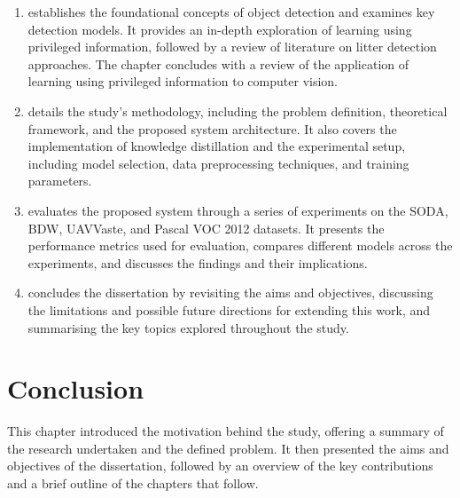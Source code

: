 \begin{enumerate}[label=\textbf{Chapter \arabic*}, leftmargin=*, start=2]
    

    \item establishes the foundational concepts of object detection and examines key detection models. It provides an in-depth exploration of learning using privileged information, followed by a review of literature on litter detection approaches. The chapter concludes with a review of the application of learning using privileged information to computer vision.
    
    \item details the study's methodology, including the problem definition, theoretical framework, and the proposed system architecture. It also covers the implementation of knowledge distillation and the experimental setup, including model selection, data preprocessing techniques, and training parameters.
    
    \item evaluates the proposed system through a series of experiments on the SODA, BDW, UAVVaste, and Pascal VOC 2012 datasets. It presents the performance metrics used for evaluation, compares different models across the experiments, and discusses the findings and their implications.
    

    \item concludes the dissertation by revisiting the aims and objectives, discussing the limitations and possible future directions for extending this work, and summarising the key topics explored throughout the study.
\end{enumerate}

\section{Conclusion}
\label{sec:conclusion_intro}

This chapter introduced the motivation behind the study, offering a summary of the research undertaken and the defined problem. It then presented the aims and objectives of the dissertation, followed by an overview of the key contributions and a brief outline of the chapters that follow.
